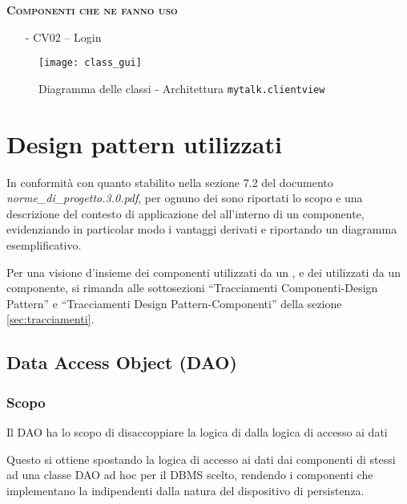\begin{itemize}[leftmargin=0em]
\begin{description}
  \item{\scshape\bfseries Componenti che ne fanno uso}
  \begin{itemize}[noitemsep,nolistsep]
    \item[-] \textsf{CV02 -- Login}
  \end{itemize}
\end{description}

\end{itemize}

\begin{figure}[H]
  \centering
  \texttt{[image: class\_gui]}
  \caption{Diagramma delle classi - Architettura \texttt{mytalk.clientview}}\label{fig:sottoarchview}
\end{figure}
\clearpage

\section{Design pattern utilizzati}
In conformità con quanto stabilito nella sezione 7.2 del documento \textit{norme\_di\_progetto.3.0.pdf}, per ognuno dei  sono riportati lo scopo e una descrizione del contesto di applicazione del  all'interno di un componente, evidenziando in particolar modo i vantaggi derivati e riportando un diagramma esemplificativo.

Per una visione d'insieme dei componenti utilizzati da un , e dei  utilizzati da un componente, si rimanda alle sottosezioni ``Tracciamenti Componenti-Design Pattern'' e ``Tracciamenti Design Pattern-Componenti'' della sezione \vref{sec:tracciamenti}.

\subsection{Data Access Object (DAO)}\label{sec:patterndao}

\subsubsection{Scopo}
Il  DAO ha lo scopo di disaccoppiare la logica di  dalla logica di accesso ai dati

Questo si ottiene spostando la logica di accesso ai dati dai componenti di  stessi ad una classe DAO ad hoc per il DBMS scelto, rendendo i componenti che implementano la  indipendenti dalla natura del dispositivo di persistenza.

